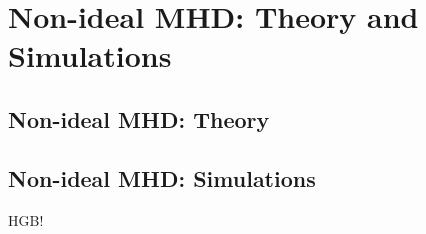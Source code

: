 \chapter{Non-ideal MHD: Theory and Simulations}

\section{Non-ideal MHD: Theory}

\section{Non-ideal MHD: Simulations}
HGB!



